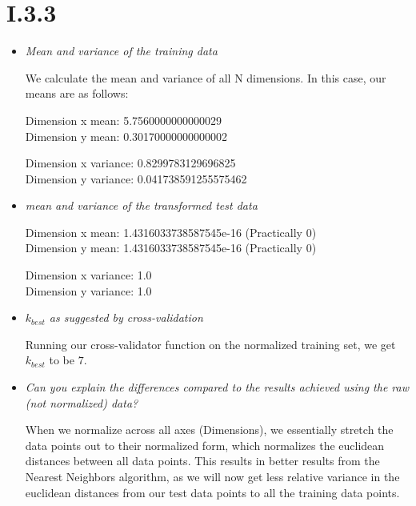 \documentclass[12pt, a4paper]{article}
\begin{document}
\section{I.3.3}
\begin{itemize}
\item \textit{Mean and variance of the training data}

We calculate the mean and variance of all N dimensions. In this case, our means are as follows:

Dimension x mean: 5.7560000000000029 \\
Dimension y mean: 0.30170000000000002

Dimension x variance: 0.8299783129696825 \\
Dimension y variance: 0.041738591255575462

\item \textit{mean and variance of the transformed test data}

Dimension x mean: 1.4316033738587545e-16 (Practically 0) \\
Dimension y mean: 1.4316033738587545e-16 (Practically 0)

Dimension x variance: 1.0 \\
Dimension y variance: 1.0

\item \textit{$k_{best}$ as suggested by cross-validation}

Running our cross-validator function on the normalized training set, we get $k_{best}$ to be $7$.

\item \textit{Can you explain the differences compared to the results achieved using the raw (not normalized) data?}

When we normalize across all axes (Dimensions), we essentially stretch the data points out to their normalized form, which normalizes the euclidean distances between all data points. This results in better results from the Nearest Neighbors algorithm, as we will now get less relative variance in the euclidean distances from our test data points to all the training data points.

\end{itemize}
\end{document}
